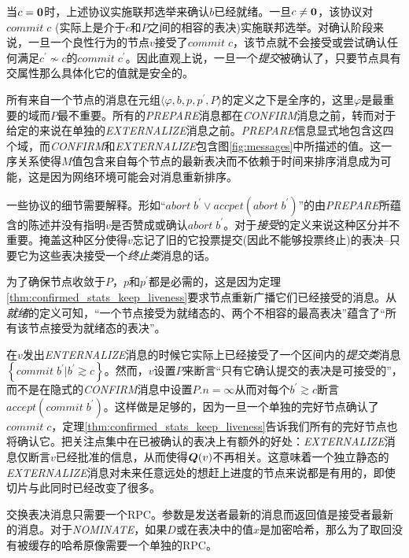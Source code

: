当$c={\bm 0}$时，上述协议实施联邦选举来确认$b$已经就绪。一旦$c\neq {\bm 0}$，该协议对$commit\;c$ (实际上是介于$c$和$P$之间的相容的表决)实施联邦选举。对确认阶段来说，一旦一个良性行为的节点$v$接受了$commit\;c$，该节点就不会接受或尝试确认任何满足$c^{\prime}\not\sim c$的$commit\;c^{\prime}$。因此直观上说，一旦一个\textit{提交}被确认了，只要节点具有{\quorum}交属性那么具体化它的值就是安全的。

所有来自一个节点的消息在元组$\langle \varphi,b,p,p^{\prime},P\rangle$的定义之下是全序的，这里$\varphi$是最重要的域而$P$最不重要。所有的\textsl{PREPARE}消息都在\textsl{CONFIRM}消息之前，转而对于给定的{\slot}来说在单独的\textsl{EXTERNALIZE}消息之前。\textsl{PREPARE}信息显式地包含这四个域，而\textsl{CONFIRM}和\textsl{EXTERNALIZE}包含{图\ref{fig:messages}}中所描述的值。这一序关系使得$M$值包含来自每个节点的最新表决而不依赖于时间来排序消息成为可能，这是因为网络环境可能会对消息重新排序。

一些协议的细节需要解释。形如``$abort\;b^{\prime}\vee accpet(abort\;b^{\prime})$''的由\textsl{PREPARE}所蕴含的陈述并没有指明$v$是否赞成或确认$abort\;b^{\prime}$。对于\textit{接受}的定义来说这种区分并不重要。掩盖这种区分使得$v$忘记了旧的它投票提交(因此不能够投票终止)的表决--只要它为这些表决接受一个\textit{终止类}消息的话。

为了确保节点收敛于$P$，$p$和$p^{\prime}$都是必需的，这是因为定理\ref{thm:confirmed_stats_keep_liveness}要求节点重新广播它们已经接受的消息。从\textit{就绪}的定义可知，``一个节点接受为就绪态的、两个不相容的最高表决''蕴含了``所有该节点接受为就绪态的表决''。

在$v$发出\textsl{ENTERNALIZE}消息的时候它实际上已经接受了一个区间内的\textit{提交类}消息$\left\{commit\;b^{\prime}|b^{\prime}\gtrsim c\right\}$。然而，$v$设置$P$来断言``只有它确认提交的表决是可接受的''，而不是在隐式的\textsl{CONFIRM}消息中设置$P.n=\infty$从而对每个$b^{\prime}\gtrsim c$断言$accept(commit\;b^{\prime})$。这样做是足够的，因为一旦一个单独的完好节点确认了$commit\;c$，定理\ref{thm:confirmed_stats_keep_liveness}告诉我们所有的完好节点也将确认它。把关注点集中在已被确认的表决上有额外的好处：\textsl{EXTERNALIZE}消息仅断言$v$已经批准的信息，从而使得${\bm Q}(v)$不再相关。这意味着一个独立静态的\textsl{EXTERNALIZE}消息对未来任意远处的想赶上进度的节点来说都是有用的，即使{\quorum}切片与此同时已经改变了很多。

交换表决消息只需要一个RPC。参数是发送者最新的消息而返回值是接受者最新的消息。对于\textsl{NOMINATE}，如果$D$或在表决中的值$x$是加密哈希，那么为了取回没有被缓存的哈希原像需要一个单独的RPC。